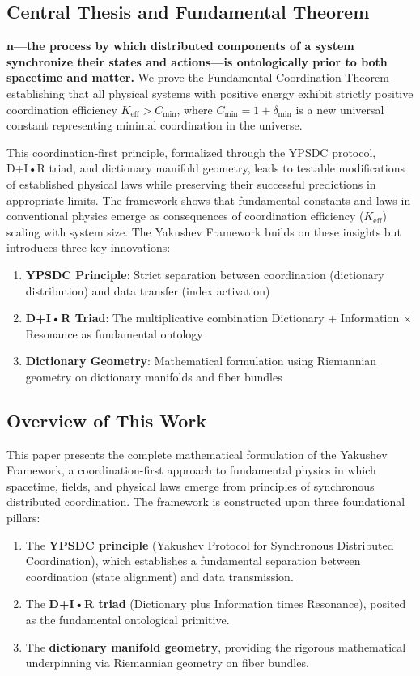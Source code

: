 \documentclass[11pt,a4paper]{article}
\begin{document}
	\subsection{Central Thesis and Fundamental Theorem}
	
	\textbf{n—the process by which distributed components of a system synchronize their states and actions—is ontologically prior to both spacetime and matter.} We prove the Fundamental Coordination Theorem establishing that all physical systems with positive energy exhibit strictly positive coordination efficiency $K_{\mathrm{eff}} > C_{\min}$, where $C_{\min} = 1 + \delta_{\min}$ is a new universal constant representing minimal coordination in the universe.
	
	This coordination-first principle, formalized through the YPSDC protocol, D+I•R triad, and dictionary manifold geometry, leads to testable modifications of established physical laws while preserving their successful predictions in appropriate limits. The framework shows that fundamental constants and laws in conventional physics emerge as consequences of coordination efficiency ($K_{\mathrm{eff}}$) scaling with system size.
	The Yakushev Framework builds on these insights but introduces three key innovations:
	\begin{enumerate}
		\item \textbf{YPSDC Principle}: Strict separation between coordination (dictionary distribution) and data transfer (index activation)
		\item \textbf{D+I•R Triad}: The multiplicative combination Dictionary + Information × Resonance as fundamental ontology
		\item \textbf{Dictionary Geometry}: Mathematical formulation using Riemannian geometry on dictionary manifolds and fiber bundles
	\end{enumerate}
	
\subsection{Overview of This Work}
This paper presents the complete mathematical formulation of the Yakushev Framework, a coordination-first approach to fundamental physics in which spacetime, fields, and physical laws emerge from principles of synchronous distributed coordination. The framework is constructed upon three foundational pillars:
\begin{enumerate}
	\item The \textbf{YPSDC principle} (Yakushev Protocol for Synchronous Distributed Coordination), which establishes a fundamental separation between coordination (state alignment) and data transmission.
	\item The \textbf{D+I•R triad} (Dictionary plus Information times Resonance), posited as the fundamental ontological primitive.
	\item The \textbf{dictionary manifold geometry}, providing the rigorous mathematical underpinning via Riemannian geometry on fiber bundles.
\end{enumerate}
\end{document}
